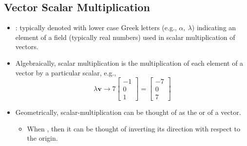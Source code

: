\begin{itemize}
  \subsection{Vector Scalar Multiplication}\label{Vector Scalar Multiplication}
  \begin{itemize}
    \item {}: typically denoted with lower case Greek letters (e.g., \(\alpha,~\lambda \)) indicating an element of a field (typically real numbers) used in scalar multiplication of vectors. 
    \item Algebraically, scalar multiplication is the multiplication of each element of a vector by a particular scalar, e.g.,
    \[%
    \lambda \bm{v} \rightarrow 7 \begin{bmatrix}
      -1 \\
      0 \\
      1 \
    \end{bmatrix} = \begin{bmatrix}
      -7 \\
      0 \\
      7 \
    \end{bmatrix}
    \]%
    \item Geometrically, scalar-multiplication can be thought of as the  or  of a vector.
    \begin{itemize}
      \item When \bbb{\(\lambda \) < 0}, then it can be thought of inverting its direction with respect to the origin.  
    \end{itemize}
  \end{itemize}  
\end{itemize}
  

